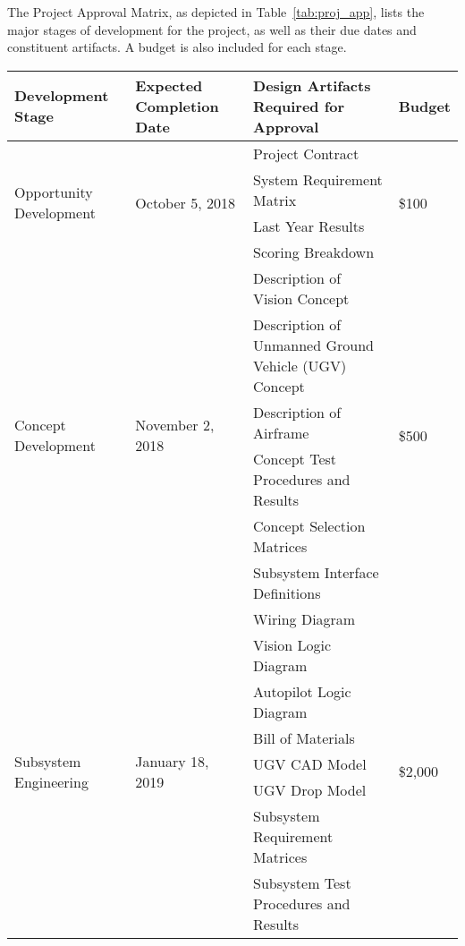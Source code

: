 

The Project Approval Matrix, as depicted in Table~\ref{tab:proj_app}, lists the major stages of development for the project, as well as their due dates and constituent artifacts. A budget is also included for each stage. 

\newpage
\begin{center}
\label{tab:proj_app}
\begin{tabular}{|p{4cm}|p{3.5cm}|p{7cm}|p{1.5cm}|}
 \hline	
\rowcolor[HTML]{C0C0C0}	
{\color[HTML]{000000} \textbf{Development Stage}} & {\color[HTML]{000000} \textbf{Expected Completion Date}} & {\color[HTML]{000000} \textbf{Design Artifacts Required for Approval}} & {\color[HTML]{000000} \textbf{Budget}}\\ \hline	

\multirow{4}{4cm}{Opportunity Development} & \multirow{4}{*}{October 5, 2018} & Project Contract & \multirow{4}{*}{\$100}\\
	&	& System Requirement Matrix&	\\
	&	& Last Year Results&	\\
	&	& Scoring Breakdown &	\\ \hline	

\multirow{6}{4cm}{Concept Development} & \multirow{6}{3.5cm}{ November 2, 2018} & Description of Vision Concept&\multirow{6}{1.5cm}{\$500}\\
	&	& Description of Unmanned Ground Vehicle (UGV) Concept&		\\
	&	& Description of Airframe&		\\
	&	& Concept Test Procedures and Results&	\\
	&	& Concept Selection Matrices&	\\
	&	& Subsystem Interface Definitions&	\\ \hline	

\multirow{8}{4cm}{Subsystem Engineering} & \multirow{8}{3.5cm}{January 18, 2019} & Wiring Diagram&\multirow{8}{1.5cm}{\$2,000}\\
	&	&Vision Logic Diagram&	\\
	&	&Autopilot Logic Diagram&	\\
	&	& Bill of Materials&	\\
	&	&UGV CAD Model&	\\
	&	&UGV Drop Model&	\\
	&	& Subsystem Requirement Matrices&	\\
	&	& Subsystem Test Procedures and Results & \\ \hline	


\end{tabular}
\end{center}
